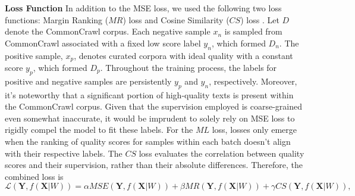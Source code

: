 \documentclass{article}
\begin{document}

 


\textbf{Loss Function} In addition to the MSE loss\cite{mesgar_neural_2018}, we used the following two loss functions: Margin Ranking ($MR$) loss \cite{liu2021temp} and Cosine Similarity ($CS$) loss \cite{wang_use_2022}. Let $D$ denote the CommonCrawl corpus. Each negative sample $x_n$ is sampled from CommonCrawl associated with a fixed low score label $y_n$, which formed $D_n$. The positive sample, $x_p$, denotes curated corpora with ideal quality with a constant score $y_p$, which formed $D_p$. Throughout the training process, the labels for positive and negative samples are persistently $y_p$ and $y_n$, respectively. Moreover, it's noteworthy that a significant portion of high-quality texts is present within the CommonCrawl corpus. Given that the supervision employed is coarse-grained even somewhat inaccurate, it would be imprudent to solely rely on MSE loss to rigidly compel the model to fit these labels. For the $ML$ loss, losses only emerge when the ranking of quality scores for samples within each batch doesn't align with their respective labels. The $CS$ loss evaluates the correlation between quality scores and their supervision, rather than their absolute differences. Therefore, the combined loss is 
\begin{equation}
    \mathcal{L}(\boldsymbol{Y}, f(\boldsymbol{X }| W)) =\alpha MSE(\boldsymbol{Y}, f(\boldsymbol{X} | W))+\beta MR(\boldsymbol{Y}, f(\boldsymbol{X} | W))+ \gamma CS(\boldsymbol{Y}, f(\boldsymbol{X} | W)),
\end{equation}
\end{document}
